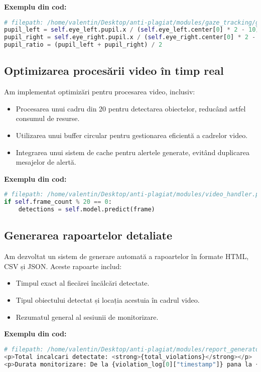 \documentclass[12pt,a4paper]{article}
\begin{document}
\textbf{Exemplu din cod:}
\begin{lstlisting}[language=Python]
# filepath: /home/valentin/Desktop/anti-plagiat/modules/gaze_tracking/gaze_tracker.py
pupil_left = self.eye_left.pupil.x / (self.eye_left.center[0] * 2 - 10)
pupil_right = self.eye_right.pupil.x / (self.eye_right.center[0] * 2 - 10)
pupil_ratio = (pupil_left + pupil_right) / 2
\end{lstlisting}

\subsection{Optimizarea procesării video în timp real}
Am implementat optimizări pentru procesarea video, inclusiv:
\begin{itemize}
    \item Procesarea unui cadru din 20 pentru detectarea obiectelor, reducând astfel consumul de resurse.
    \item Utilizarea unui buffer circular pentru gestionarea eficientă a cadrelor video.
    \item Integrarea unui sistem de cache pentru alertele generate, evitând duplicarea mesajelor de alertă.
\end{itemize}

\textbf{Exemplu din cod:}
\begin{lstlisting}[language=Python]
# filepath: /home/valentin/Desktop/anti-plagiat/modules/video_handler.py
if self.frame_count % 20 == 0:
    detections = self.model.predict(frame)
\end{lstlisting}

\subsection{Generarea rapoartelor detaliate}
Am dezvoltat un sistem de generare automată a rapoartelor în formate HTML, CSV și JSON. Aceste rapoarte includ:
\begin{itemize}
    \item Timpul exact al fiecărei încălcări detectate.
    \item Tipul obiectului detectat și locația acestuia în cadrul video.
    \item Rezumatul general al sesiunii de monitorizare.
\end{itemize}

\textbf{Exemplu din cod:}
\begin{lstlisting}[language=Python]
# filepath: /home/valentin/Desktop/anti-plagiat/modules/report_generator.py
<p>Total incalcari detectate: <strong>{total_violations}</strong></p>
<p>Durata monitorizare: De la {violation_log[0]["timestamp"]} pana la {violation_log[-1]["timestamp"]}</p>
\end{lstlisting}
\end{document}
